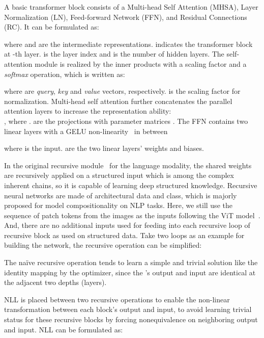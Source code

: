 \documentclass[runningheads]{llncs}
\begin{document}
	 A basic transformer block  consists of a Multi-head Self Attention (MHSA), Layer Normalization (LN), Feed-forward Network (FFN), and Residual Connections (RC). It can be formulated as:
	
	where  and  are the intermediate representations.  indicates the transformer block at -th layer.  is the layer index and  is the number of hidden layers. The self-attention module is realized by the inner products with a scaling factor and a {\em softmax} operation, which is written as:
	
	where  are {\em query}, {\em key} and {\em value} vectors, respectively.  is the scaling factor for normalization. Multi-head self attention further concatenates the parallel attention layers to increase the representation ability:\\ 
	, 
	where .  are the projections with parameter matrices . 
	The FFN contains two linear layers with a GELU non-linearity~\cite{hendrycks2016gaussian} in between
	
	where  is the input.  are the two linear layers' weights and biases.
	
	 In the original recursive module~\cite{sperduti1997supervised} for the language modality, the shared weights are recursively applied on a structured input which is among the complex inherent chains, so it is capable of learning deep structured knowledge. Recursive neural networks are made of architectural data and class, which is majorly proposed for model compositionality on NLP tasks. Here, we still use the sequence of patch tokens from the images as the inputs following the ViT model~\cite{dosovitskiy2021an}. And, there are no additional inputs used for feeding into each recursive loop of recursive block as used on structured data. Take two loops as an example for building the network, the recursive operation can be simplified:
	
	The na\"ive recursive operation tends to learn a simple and trivial solution like the identity mapping by the optimizer, since the 's output and input are identical at the adjacent two depths (layers).
	
	 NLL is placed between two recursive operations to enable the non-linear transformation between each block's output and input, to avoid learning trivial status for these recursive blocks by forcing nonequivalence on neighboring output and input. NLL can be formulated as:
	
\end{document}
